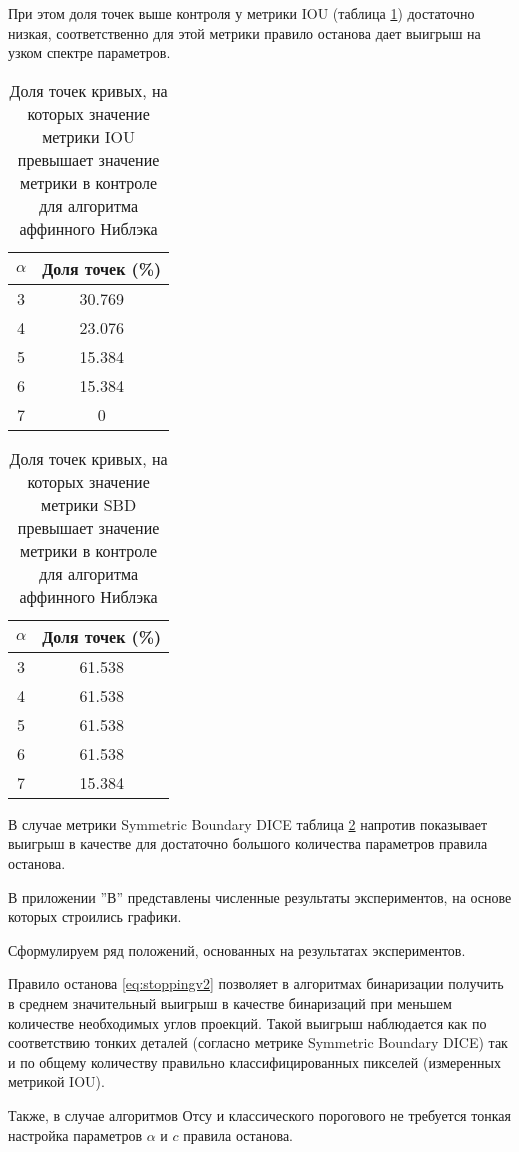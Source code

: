 При этом доля точек выше контроля у метрики IOU (таблица \ref*{tab:niblackiou}) достаточно низкая, соответственно для этой метрики правило останова дает выигрыш на узком спектре параметров.



\begin{table}[H]
\centering
\caption{Доля точек кривых, на которых значение метрики IOU превышает значение метрики в  контроле для алгоритма аффинного Ниблэка}
\label{tab:niblackiou}
\begin{tabular}{|c|c|}
\hline
\(\alpha\) & Доля точек (\%) \\
\hline
3 & 30.769 \\
4 & 23.076 \\
5 & 15.384 \\
6 & 15.384 \\
7 &  0 \\
\hline
\end{tabular}
\end{table}

\begin{table}[H]
\centering
\caption{Доля точек кривых, на которых значение метрики SBD превышает значение метрики в  контроле для алгоритма аффинного Ниблэка}
\label{tab:niblacksbd}
\begin{tabular}{|c|c|}
\hline
\(\alpha\) & Доля точек (\%) \\
\hline
3 & 61.538 \\
4 & 61.538 \\
5 & 61.538 \\
6 & 61.538 \\
7 & 15.384 \\
\hline
\end{tabular}
\end{table}

В случае метрики Symmetric Boundary DICE таблица \ref*{tab:niblacksbd} напротив показывает выигрыш в качестве для достаточно большого количества параметров правила останова.

В приложении ''В'' представлены численные результаты экспериментов, на основе которых строились графики.

Сформулируем ряд положений, основанных на результатах экспериментов.

Правило останова \ref*{eq:stoppingv2} позволяет в алгоритмах бинаризации получить в среднем значительный выигрыш в качестве бинаризаций при меньшем количестве необходимых углов проекций. Такой выигрыш наблюдается как по соответствию тонких деталей (согласно метрике Symmetric Boundary DICE) так и по общему количеству правильно классифицированных пикселей (измеренных метрикой IOU).

Также, в случае алгоритмов Отсу и классического порогового не требуется тонкая настройка параметров \(\alpha\) и \(c\) правила останова.